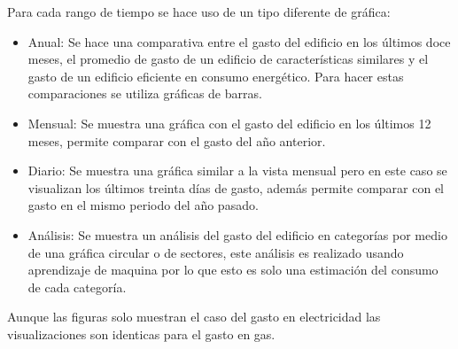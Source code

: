 Para cada rango de tiempo se hace uso de un tipo diferente de gráfica:
\begin{itemize}
\item Anual: Se hace una comparativa entre el gasto del edificio en los últimos doce
  meses, el promedio de gasto de un edificio de características similares y
  el gasto de un edificio eficiente en consumo energético. Para hacer estas
  comparaciones se utiliza gráficas de barras.
\item Mensual: Se muestra una gráfica con el gasto del edificio en los últimos 12
  meses, permite comparar con el gasto del año anterior.
\item Diario: Se muestra una gráfica similar a la vista mensual pero en este caso
  se visualizan los últimos treinta días de gasto, además permite comparar
  con el gasto en el mismo periodo del año pasado.
\item Análisis: Se muestra un análisis del gasto del edificio en categorías
  por medio de una gráfica circular o de sectores, este análisis es realizado
  usando aprendizaje de maquina por lo que esto es solo una estimación del consumo
  de cada categoría.
\end{itemize}

Aunque las figuras solo muestran el caso del gasto en electricidad las
visualizaciones son identicas para el gasto en gas.
